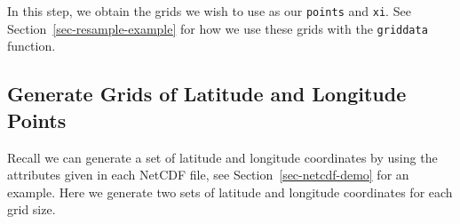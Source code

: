 \documentclass[
  letterpaper,
  DIV=11,
  numbers=noendperiod]{scrreprt}
\begin{document}
In this step, we obtain the grids we wish to use as our \texttt{points}
and \texttt{xi}. See Section~\ref{sec-resample-example} for how we use
these grids with the \texttt{griddata} function.

\subsection{Generate Grids of Latitude and Longitude
Points}\label{generate-grids-of-latitude-and-longitude-points}

Recall we can generate a set of latitude and longitude coordinates by
using the attributes given in each NetCDF file, see
Section~\ref{sec-netcdf-demo} for an example. Here we generate two sets
of latitude and longitude coordinates for each grid size.

\label{annotated-cell-15}%
\end{document}
